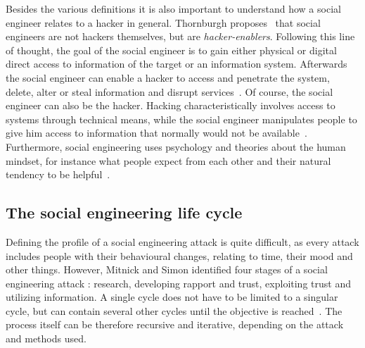 Besides the various definitions it is also important to understand how a
social engineer relates to a hacker in general. Thornburgh
proposes~\cite{thornburgh2004} that social engineers are not hackers
themselves, but are \textit{hacker-enablers}. Following this line of thought,
the goal of the social engineer is to gain either physical or digital direct
access to information of the target or an information system. Afterwards the
social engineer can enable a hacker to access and penetrate the system, delete,
alter or steal information and disrupt services~\cite{thornburgh2004}. Of
course, the social engineer can also be the hacker. Hacking characteristically
involves access to systems through technical means, while the social engineer
manipulates people to give him access to information that normally would not
be available~\cite{jones2004}. Furthermore, social engineering uses psychology
and theories about the human mindset, for instance what people expect from each
other and their natural tendency to be helpful~\cite{jones2004}.


\subsection{The social engineering life cycle}

Defining the profile of a social engineering attack is quite difficult, as
every attack includes people with their behavioural changes, relating to time,
their mood and other things. However, Mitnick and Simon identified four stages
of a social engineering attack \cite{mitnick2003}: research, developing rapport
and trust, exploiting trust and utilizing information. A single cycle does not
have to be limited to a singular cycle, but can contain several other cycles
until the objective is reached~\cite{thornburgh2004}. The process itself can be
therefore recursive and iterative, depending on the attack and methods used.

